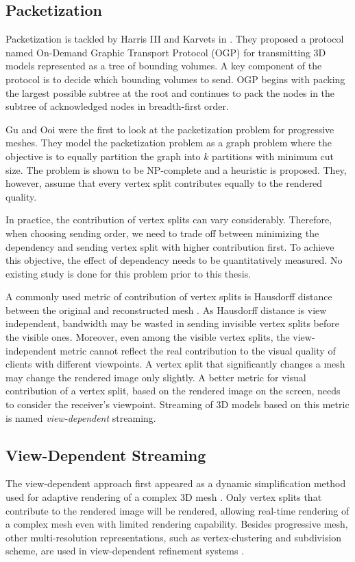     \subsection{Packetization}
    \label{ss:intro:packetization}
    Packetization is tackled by
    Harris III and Karvets in \cite{harris:design}.   
    They proposed a protocol named On-Demand Graphic Transport Protocol (OGP)
    for transmitting 3D models represented as a tree of bounding volumes.
    A key component of the protocol is to decide which bounding volumes
    to send.  OGP begins with packing the largest possible subtree at
    the root and continues to pack the nodes in the subtree of
    acknowledged nodes in breadth-first order.  
    
    Gu and Ooi \cite{Gu:Packetization} were the first to look at
    the packetization problem for progressive meshes.  They model
    the packetization problem as a graph problem where the objective
    is to equally partition the graph into $k$ partitions with minimum
    cut size.  The problem is shown to be NP-complete and a heuristic
    is proposed.  They, however, assume that every vertex split contributes 
    equally to the rendered quality.
    
    In practice, the contribution of vertex splits can
    vary considerably. Therefore, when choosing sending order, we
    need to trade off between minimizing the dependency and sending 
    vertex split with higher contribution first. To achieve this objective,
    the effect of dependency needs to be quantitatively measured.
    No existing study is done for this problem
    prior to this thesis.

    A commonly used metric of contribution of vertex splits is 
    Hausdorff distance between the original and reconstructed mesh \cite{cignoni98metro}.
    As Hausdorff distance is view independent, 
    bandwidth may be wasted in sending invisible vertex splits
    before the visible ones. Moreover, even among the visible vertex splits,
    the view-independent metric cannot reflect the real contribution to the visual quality of
    clients with different viewpoints. A vertex split that significantly
    changes a mesh may change the rendered image 
    only slightly.  A better metric for visual contribution of a vertex split,
    based on the rendered image on the screen, 
    needs to consider the receiver's viewpoint.
    Streaming of 3D models based on this metric is named \emph{view-dependent} streaming.

    \subsection{View-Dependent Streaming}
    The view-dependent approach first appeared as 
    a dynamic simplification method used for adaptive rendering of a complex 3D mesh
    \cite{258843, 258847}. Only vertex splits that contribute to the rendered
    image will be rendered, allowing real-time rendering of a complex mesh
    even with limited rendering capability.
    Besides progressive mesh, other multi-resolution representations, 
    such as vertex-clustering  and subdivision scheme,
    are used in view-dependent refinement systems \cite{245627, efficient:Alliez,602344}.

